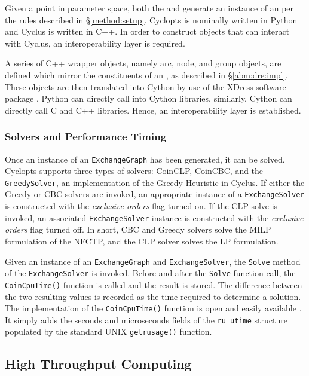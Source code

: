 Given a point in parameter space, both the  and
 generate an instance of an  per the
rules described in \S \ref{method:setup}. Cyclopts is nominally written in
Python and Cyclus is written in C++. In order to construct objects that can
interact with Cyclus, an interoperability layer is required. 

A series of C++ wrapper objects, namely arc, node, and group objects, are
defined which mirror the constituents of an , as described
in \S \ref{abm:dre:impl}. These objects are then translated into Cython
\cite{behnel2010cython} by use of the XDress software package
\cite{xdress}. Python can directly call into Cython libraries, similarly, Cython
can directly call C and C++ libraries. Hence, an interoperability layer is
established.

\subsubsection{Solvers and Performance Timing}

Once an instance of an \texttt{ExchangeGraph} has been generated, it can be
solved. Cyclopts supports three types of solvers: CoinCLP, CoinCBC, and the
\texttt{GreedySolver}, an implementation of the Greedy Heuristic in Cyclus. If
either the Greedy or CBC solvers are invoked, an appropriate instance of a
\texttt{ExchangeSolver} is constructed with the \textit{exclusive orders} flag
turned on. If the CLP solve is invoked, an associated \texttt{ExchangeSolver}
instance is constructed with the \textit{exclusive orders} flag turned off. In
short, CBC and Greedy solvers solve the MILP formulation of the NFCTP, and the
CLP solver solves the LP formulation.

Given an instance of an \texttt{ExchangeGraph} and \texttt{ExchangeSolver}, the
\texttt{Solve} method of the \texttt{ExchangeSolver} is invoked. Before and
after the \texttt{Solve} function call, the \texttt{CoinCpuTime()} function is
called and the result is stored. The difference between the two resulting values
is recorded as the time required to determine a solution. The implementation of
the \texttt{CoinCpuTime()} function is open and easily available
\cite{coinosi}. It simply adds the seconds and microseconds fields of the
\texttt{ru\_utime} structure populated by the standard UNIX
\texttt{getrusage()} function.

\subsection{High Throughput Computing}\label{method:tools:htc}

